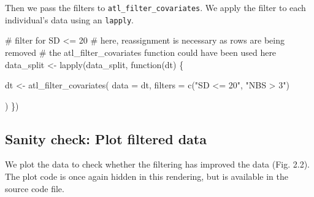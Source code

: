 \documentclass[]{scrreprt}
\newenvironment{Shaded}{}{}
\newcommand{\CommentTok}[1]{\textcolor[rgb]{0.00,0.50,0.00}{#1}}
\newcommand{\ControlFlowTok}[1]{\textcolor[rgb]{0.00,0.00,1.00}{#1}}
\newcommand{\DataTypeTok}[1]{#1}
\newcommand{\KeywordTok}[1]{\textcolor[rgb]{0.00,0.00,1.00}{#1}}
\newcommand{\NormalTok}[1]{#1}
\newcommand{\StringTok}[1]{\textcolor[rgb]{0.00,0.50,0.50}{#1}}
\begin{document}
Then we pass the filters to \texttt{atl\_filter\_covariates}.
We apply the filter to each individual's data using an \texttt{lapply}.

\begin{Shaded}
\begin{Highlighting}[]
\CommentTok{# filter for SD <= 20}
\CommentTok{# here, reassignment is necessary as rows are being removed}
\CommentTok{# the atl_filter_covariates function could have been used here}
\NormalTok{data_split <-}\StringTok{ }\KeywordTok{lapply}\NormalTok{(data_split, }\ControlFlowTok{function}\NormalTok{(dt) \{}
  
\NormalTok{  dt <-}\StringTok{ }\KeywordTok{atl_filter_covariates}\NormalTok{(}
    \DataTypeTok{data =}\NormalTok{ dt,}
    \DataTypeTok{filters =} \KeywordTok{c}\NormalTok{(}\StringTok{"SD <= 20"}\NormalTok{,}
                \StringTok{"NBS > 3"}\NormalTok{)}
    
\NormalTok{  )}
\NormalTok{\})}
\end{Highlighting}
\end{Shaded}

\hypertarget{sanity-check-plot-filtered-data}{%
\subsection{Sanity check: Plot filtered data}\label{sanity-check-plot-filtered-data}}

We plot the data to check whether the filtering has improved the data (Fig. 2.2).
The plot code is once again hidden in this rendering, but is available in the source code file.
\end{document}
